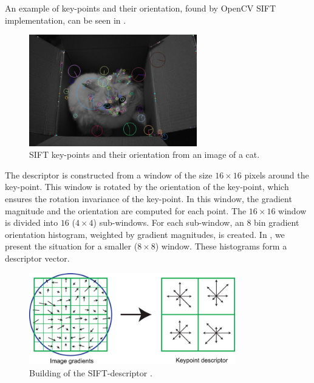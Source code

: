 An example of key-points and their orientation, found by OpenCV SIFT implementation, can be seen in .
\begin{figure}[ht!]
    \centering
    \includegraphics[width=0.65\textwidth]{Figures/sift/sift_example.jpg}
    \caption[SIFT key-points and their orientation from an image of a cat]{SIFT key-points and their orientation from an image of a cat.}
    \label{fig:sift_example}
\end{figure}

The descriptor is constructed from a window of the size $16\times16$ pixels around the key-point. This window is rotated by the orientation of the key-point, which ensures the rotation invariance of the key-point. In this window, the gradient magnitude and the orientation are computed for each point. The $16\times16$ window is divided into $16$ ($4\times4$) sub-windows. For each sub-window, an $8$ bin gradient orientation histogram, weighted by gradient magnitudes, is created. In , we present the situation for a smaller ($8\times8$) window. These histograms form a descriptor vector.

\begin{figure}
    \centering
    \includegraphics[width=0.8\textwidth]{Figures/sift/descriptor.jpg}
    \caption[Building of the SIFT-descriptor]{Building of the SIFT-descriptor \cite{Lowe2004}.}
    \label{fig:sift_descriptor}
\end{figure}
